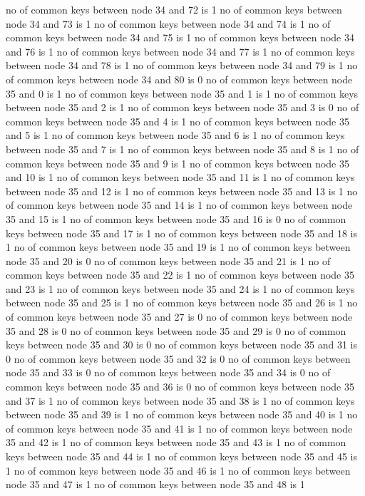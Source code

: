 no of common keys between node 34 and 72 is 1
no of common keys between node 34 and 73 is 1
no of common keys between node 34 and 74 is 1
no of common keys between node 34 and 75 is 1
no of common keys between node 34 and 76 is 1
no of common keys between node 34 and 77 is 1
no of common keys between node 34 and 78 is 1
no of common keys between node 34 and 79 is 1
no of common keys between node 34 and 80 is 0
no of common keys between node 35 and 0 is 1
no of common keys between node 35 and 1 is 1
no of common keys between node 35 and 2 is 1
no of common keys between node 35 and 3 is 0
no of common keys between node 35 and 4 is 1
no of common keys between node 35 and 5 is 1
no of common keys between node 35 and 6 is 1
no of common keys between node 35 and 7 is 1
no of common keys between node 35 and 8 is 1
no of common keys between node 35 and 9 is 1
no of common keys between node 35 and 10 is 1
no of common keys between node 35 and 11 is 1
no of common keys between node 35 and 12 is 1
no of common keys between node 35 and 13 is 1
no of common keys between node 35 and 14 is 1
no of common keys between node 35 and 15 is 1
no of common keys between node 35 and 16 is 0
no of common keys between node 35 and 17 is 1
no of common keys between node 35 and 18 is 1
no of common keys between node 35 and 19 is 1
no of common keys between node 35 and 20 is 0
no of common keys between node 35 and 21 is 1
no of common keys between node 35 and 22 is 1
no of common keys between node 35 and 23 is 1
no of common keys between node 35 and 24 is 1
no of common keys between node 35 and 25 is 1
no of common keys between node 35 and 26 is 1
no of common keys between node 35 and 27 is 0
no of common keys between node 35 and 28 is 0
no of common keys between node 35 and 29 is 0
no of common keys between node 35 and 30 is 0
no of common keys between node 35 and 31 is 0
no of common keys between node 35 and 32 is 0
no of common keys between node 35 and 33 is 0
no of common keys between node 35 and 34 is 0
no of common keys between node 35 and 36 is 0
no of common keys between node 35 and 37 is 1
no of common keys between node 35 and 38 is 1
no of common keys between node 35 and 39 is 1
no of common keys between node 35 and 40 is 1
no of common keys between node 35 and 41 is 1
no of common keys between node 35 and 42 is 1
no of common keys between node 35 and 43 is 1
no of common keys between node 35 and 44 is 1
no of common keys between node 35 and 45 is 1
no of common keys between node 35 and 46 is 1
no of common keys between node 35 and 47 is 1
no of common keys between node 35 and 48 is 1
